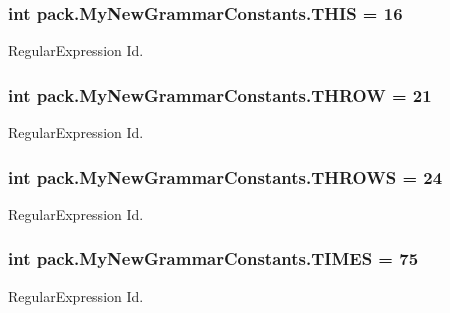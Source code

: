 \subsubsection[{\texorpdfstring{T\+H\+IS}{THIS}}]{\setlength{\rightskip}{0pt plus 5cm}int pack.\+My\+New\+Grammar\+Constants.\+T\+H\+IS = 16}\hypertarget{interfacepack_1_1_my_new_grammar_constants_a5772aa9300dca34495f671291af701f2}{}\label{interfacepack_1_1_my_new_grammar_constants_a5772aa9300dca34495f671291af701f2}
Regular\+Expression Id. 
\subsubsection[{\texorpdfstring{T\+H\+R\+OW}{THROW}}]{\setlength{\rightskip}{0pt plus 5cm}int pack.\+My\+New\+Grammar\+Constants.\+T\+H\+R\+OW = 21}\hypertarget{interfacepack_1_1_my_new_grammar_constants_a23e8a02a765e9f99dc473a9c2f2a2c93}{}\label{interfacepack_1_1_my_new_grammar_constants_a23e8a02a765e9f99dc473a9c2f2a2c93}
Regular\+Expression Id. 
\subsubsection[{\texorpdfstring{T\+H\+R\+O\+WS}{THROWS}}]{\setlength{\rightskip}{0pt plus 5cm}int pack.\+My\+New\+Grammar\+Constants.\+T\+H\+R\+O\+WS = 24}\hypertarget{interfacepack_1_1_my_new_grammar_constants_a3bc0622334927452cdbb84c9c642d151}{}\label{interfacepack_1_1_my_new_grammar_constants_a3bc0622334927452cdbb84c9c642d151}
Regular\+Expression Id. 
\subsubsection[{\texorpdfstring{T\+I\+M\+ES}{TIMES}}]{\setlength{\rightskip}{0pt plus 5cm}int pack.\+My\+New\+Grammar\+Constants.\+T\+I\+M\+ES = 75}\hypertarget{interfacepack_1_1_my_new_grammar_constants_aeddd63c72d0a7b30319a2c28b0f81ab2}{}\label{interfacepack_1_1_my_new_grammar_constants_aeddd63c72d0a7b30319a2c28b0f81ab2}
Regular\+Expression Id. 
